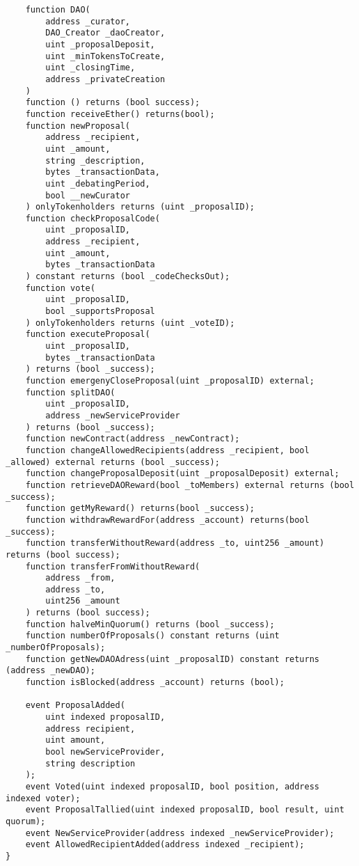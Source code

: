 \documentclass[9pt,oneside]{amsart}
\begin{document}
\begin{verbatim}
    function DAO(
        address _curator,
        DAO_Creator _daoCreator,
        uint _proposalDeposit,
        uint _minTokensToCreate,
        uint _closingTime,
        address _privateCreation
    )
    function () returns (bool success);
    function receiveEther() returns(bool);
    function newProposal(
        address _recipient,
        uint _amount,
        string _description,
        bytes _transactionData,
        uint _debatingPeriod,
        bool __newCurator
    ) onlyTokenholders returns (uint _proposalID);
    function checkProposalCode(
        uint _proposalID,
        address _recipient,
        uint _amount,
        bytes _transactionData
    ) constant returns (bool _codeChecksOut);
    function vote(
        uint _proposalID,
        bool _supportsProposal
    ) onlyTokenholders returns (uint _voteID);
    function executeProposal(
        uint _proposalID,
        bytes _transactionData
    ) returns (bool _success);
    function emergenyCloseProposal(uint _proposalID) external;
    function splitDAO(
        uint _proposalID,
        address _newServiceProvider
    ) returns (bool _success);
    function newContract(address _newContract);
    function changeAllowedRecipients(address _recipient, bool _allowed) external returns (bool _success);
    function changeProposalDeposit(uint _proposalDeposit) external;
    function retrieveDAOReward(bool _toMembers) external returns (bool _success);
    function getMyReward() returns(bool _success);
    function withdrawRewardFor(address _account) returns(bool _success);
    function transferWithoutReward(address _to, uint256 _amount) returns (bool success);
    function transferFromWithoutReward(
        address _from,
        address _to,
        uint256 _amount
    ) returns (bool success);
    function halveMinQuorum() returns (bool _success);
    function numberOfProposals() constant returns (uint _numberOfProposals);
    function getNewDAOAdress(uint _proposalID) constant returns (address _newDAO);
    function isBlocked(address _account) returns (bool);

    event ProposalAdded(
        uint indexed proposalID,
        address recipient,
        uint amount,
        bool newServiceProvider,
        string description
    );
    event Voted(uint indexed proposalID, bool position, address indexed voter);
    event ProposalTallied(uint indexed proposalID, bool result, uint quorum);
    event NewServiceProvider(address indexed _newServiceProvider);
    event AllowedRecipientAdded(address indexed _recipient);
}

\end{verbatim}
\end{document}
